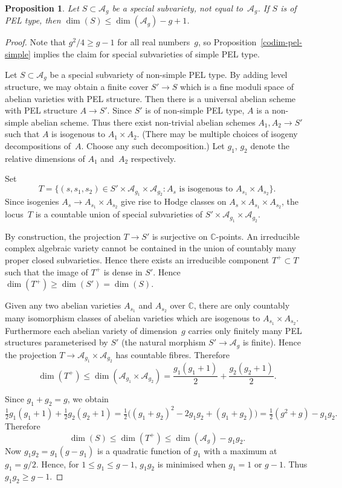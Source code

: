 \documentclass[JEP,XML,SOM,Unicode,NoFloatCountersInSection]{cedram}
\newcommand{\bC}{\mathbb{C}}
\newcommand{\cA}{\mathcal{A}}
\newcommand{\Ag}{\mathcal{A}_g}
\newtheorem{proposition}[lemma]{Proposition}
\begin{document}
\begin{proposition}\label{codim-pel}
Let $S \subset \Ag$ be a special subvariety, not equal to~$\Ag$.
If $S$ is of PEL type, then $\dim(S) \leq \dim(\Ag) - g + 1$.
\end{proposition}

\begin{proof}
Note that $g^2/4 \geq g-1$ for all real numbers~$g$, so Proposition~\ref{codim-pel-simple} implies the claim for special subvarieties of simple PEL type.

Let $S \subset \Ag$ be a special subvariety of non-simple PEL type.
By adding level structure, we may obtain a finite cover $S' \to S$ which is a fine moduli space of abelian varieties with PEL structure.
Then there is a universal abelian scheme with PEL structure $A \to S'$.
Since $S'$ is of non-simple PEL type, $A$ is a non-simple abelian scheme.
Thus there exist non-trivial abelian schemes $A_1, A_2 \to S'$ such that $A$ is isogenous to $A_1 \times A_2$. (There may be multiple choices of isogeny decompositions of~$A$. Choose any such decomposition.)
Let $g_1$, $g_2$ denote the relative dimensions of $A_1$ and~$A_2$ respectively.

Set
\[
T = \{ (s, s_1, s_2) \in S' \times \cA_{g_1} \times \cA_{g_2} : A_s \text{ is isogenous to } A_{s_1} \times A_{s_2} \}.
\]
Since isogenies $A_s \to A_{s_1} \times A_{s_2}$ give rise to Hodge classes on $A_s \times A_{s_1} \times A_{s_2}$, the locus~$T$ is a countable union of special subvarieties of $S' \times \cA_{g_1} \times \cA_{g_2}$.

By construction, the projection $T \to S'$ is surjective on $\bC$-points.
An irreducible complex algebraic variety cannot be contained in the union of countably many proper closed subvarieties.
Hence there exists an irreducible component $T^+ \subset T$ such that the image of $T^+$ is dense in $S'$.
Hence $\dim(T^+) \geq \dim(S') = \dim(S)$.

Given any two abelian varieties $A_{s_1}$ and $A_{s_2}$ over $\bC$, there are only countably many isomorphism classes of abelian varieties which are isogenous to $A_{s_1} \times A_{s_2}$.
Furthermore each abelian variety of dimension~$g$ carries only finitely many PEL structures parameterised by $S'$ (the natural morphism $S' \to \Ag$ is finite).
Hence the projection $T \to \cA_{g_1} \times \cA_{g_2}$ has countable fibres.
Therefore
\[
\dim(T^+) \leq \dim(\cA_{g_1} \times \cA_{g_2}) = \frac{g_1(g_1+1)}{2} + \frac{g_2(g_2+1)}{2}.
\]

Since $g_1+g_2=g$, we obtain
\[
\tfrac{1}{2}g_1(g_1+1) + \tfrac{1}{2}g_2(g_2+1)
= \tfrac{1}{2}\bigl( (g_1+g_2)^2 - 2g_1g_2 + (g_1+g_2) \bigr)
= \tfrac{1}{2}(g^2+g) - g_1g_2.
\]
Therefore
\[
\dim(S) \leq \dim(T^+) \leq \dim(\Ag) - g_1g_2.
\]
Now $g_1g_2 = g_1(g-g_1)$ is a quadratic function of $g_1$ with a maximum at $g_1=g/2$.
Hence, for $1 \leq g_1 \leq g-1$, $g_1g_2$ is minimised when $g_1 = 1$ or $g-1$.
Thus $g_1g_2 \geq g-1$.
\end{proof}
\end{document}
